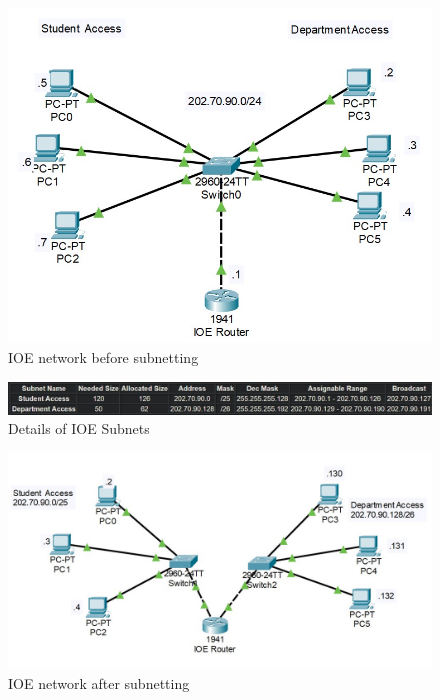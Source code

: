 \documentclass[a4paper,11pt]{article}
\begin{document}
\begin{A}
{        \begin{figure}[H]
            \centering
            \includegraphics[scale=0.85,cframe=blue 0.5pt 3pt]{./FIG/IOEB.jpg}
            \caption{IOE network before subnetting}
        \end{figure}

        \begin{figure}[H]
            \centering
            \includegraphics[scale=0.7,cframe=blue 0.5pt 3pt]{./FIG/SubTab.jpg}
            \caption{Details of IOE Subnets}
        \end{figure}


        \begin{figure}[H]
            \centering
            \includegraphics[scale=0.75,cframe=blue 0.5pt 3pt]{./FIG/IOEA.jpg}
            \caption{IOE network after subnetting}
        \end{figure}


    }
\end{A}
\end{document}
